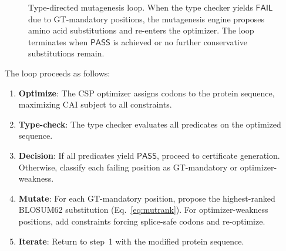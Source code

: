 \documentclass[sigplan,10pt,manuscript,review,anonymous]{acmart}
\newcommand{\PASS}{\ensuremath{\mathsf{PASS}}\xspace}
\newcommand{\FAIL}{\ensuremath{\mathsf{FAIL}}\xspace}
\begin{document}
\begin{figure}[t]
\centering
{}
\caption{Type-directed mutagenesis loop. When the type checker yields
         \FAIL{} due to GT-mandatory positions, the mutagenesis engine
         proposes amino acid substitutions and re-enters the optimizer.
         The loop terminates when \PASS{} is achieved or no further
         conservative substitutions remain.}
\label{fig:mutloop}
\end{figure}

The loop proceeds as follows:
\begin{enumerate}[leftmargin=*,itemsep=0pt,topsep=1pt]
\item \textbf{Optimize}: The CSP optimizer assigns codons to the
      protein sequence, maximizing CAI subject to all constraints.
\item \textbf{Type-check}: The type checker evaluates all predicates on
      the optimized sequence.
\item \textbf{Decision}: If all predicates yield \PASS, proceed to
      certificate generation. Otherwise, classify each failing
      position as GT-mandatory or optimizer-weakness.
\item \textbf{Mutate}: For each GT-mandatory position, propose the
      highest-ranked BLOSUM62 substitution
      (Eq.~\ref{eq:mutrank}).
      For optimizer-weakness positions, add constraints forcing
      splice-safe codons and re-optimize.
\item \textbf{Iterate}: Return to step~1 with the modified protein
      sequence.
\end{enumerate}
\end{document}
